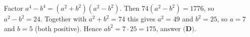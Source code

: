 Factor $a^4-b^4=(a^2+b^2)(a^2-b^2)$. Then $74(a^2-b^2)=1776$, so $a^2-b^2=24$. Together with $a^2+b^2=74$ this gives $a^2=49$ and $b^2=25$, so $a=7$ and $b=5$ (both positive). Hence $ab^2=7\cdot25=\boxed{175}$, answer $\textbf{(D)}$.
